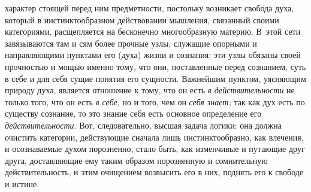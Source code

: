 характер стоящей перед ним предметности, постольку возникает свобода духа,
который в инстинктообразном действовании мышления, связанный своими
категориями, расщепляется на бесконечно многообразную материю. В~этой сети
завязываются там и сям более прочные узлы, служащие опорными и
направляющими пунктами его (духа) жизни и сознания; эти узлы обязаны своей
прочностью и мощью именно тому, что они, поставленные перед сознанием, суть
в себе и для себя сущие понятия его сущности. Важнейшим пунктом, уясняющим
природу духа, является отношение к тому, что он есть
{\em в действительности} не только того, что он есть
{\em в себе}, но и того, чем он
{\em себя знает;} так как дух есть по существу
сознание, то это знание себя есть основное определение его
{\em действительности}. Вот, следовательно, высшая
задача логики: она должна очистить категории, действующие сначала лишь
инстинктообразно, как влечения, и осознаваемые духом порозненно, стало
быть, как изменчивые и путающие друг друга, доставляющие ему таким образом
порозненную и сомнительную действительность, и этим очищением возвысить его
в них, поднять его к свободе и истине.

